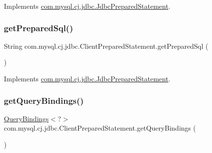 Implements \mbox{\hyperlink{interfacecom_1_1mysql_1_1cj_1_1jdbc_1_1_jdbc_prepared_statement_ac7a61028280256f1c0360f7cdfefa0e7}{com.\+mysql.\+cj.\+jdbc.\+Jdbc\+Prepared\+Statement}}.

\mbox{\label{classcom_1_1mysql_1_1cj_1_1jdbc_1_1_client_prepared_statement_aa34204b558f5f8eeec0764fbc44ef7bf}} 
\subsubsection{\texorpdfstring{get\+Prepared\+Sql()}{getPreparedSql()}}
{\footnotesize\ttfamily String com.\+mysql.\+cj.\+jdbc.\+Client\+Prepared\+Statement.\+get\+Prepared\+Sql (\begin{DoxyParamCaption}{ }\end{DoxyParamCaption})}



Implements \mbox{\hyperlink{interfacecom_1_1mysql_1_1cj_1_1jdbc_1_1_jdbc_prepared_statement_a20618e9a216f90d8366fd7e931783dda}{com.\+mysql.\+cj.\+jdbc.\+Jdbc\+Prepared\+Statement}}.

\mbox{\label{classcom_1_1mysql_1_1cj_1_1jdbc_1_1_client_prepared_statement_aa7710948c9da0ab8fc0591a3b7054c4d}} 
\subsubsection{\texorpdfstring{get\+Query\+Bindings()}{getQueryBindings()}}
{\footnotesize\ttfamily \mbox{\hyperlink{interfacecom_1_1mysql_1_1cj_1_1_query_bindings}{Query\+Bindings}}$<$?$>$ com.\+mysql.\+cj.\+jdbc.\+Client\+Prepared\+Statement.\+get\+Query\+Bindings (\begin{DoxyParamCaption}{ }\end{DoxyParamCaption})}




